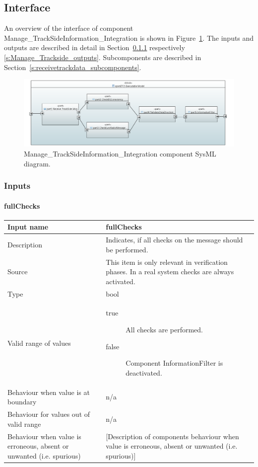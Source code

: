 \subsection{Interface}

An overview of the interface of component Manage\_TrackSideInformation\_Integration is shown in Figure~\ref{f:receiveAndCheckConsistencyArch}. The inputs and outputs are described in detail in Section~\ref{s:Manage_Trackside_inputs} respectively \ref{s:Manage_Trackside_outputs}. Subcomponents are described in Section~\ref{s:receivetrackdata_subcomponents}.

\begin{figure}
\center
\includegraphics[width=\textwidth]{./images/Input-Messages4.PNG}
\caption{Manage\_TrackSideInformation\_Integration component SysML diagram.}\label{f:receiveAndCheckConsistencyArch}
\end{figure}


\subsubsection{Inputs}\label{s:Manage_Trackside_inputs}

\paragraph{fullChecks}

\begin{longtable}{p{}p{}}
\toprule
Input name				& fullChecks \\
\midrule
Description				& Indicates, if all checks on the message should be performed. \\
\midrule
Source					& This item is only relevant in verification phases. In a real system checks are always activated. \\ 
\midrule
Type					& bool \\
\midrule
Valid range of values	& 
\begin{description}
\item[true] All checks are performed.
\item[false] Component InformationFilter is deactivated.
\end{description} \\
\midrule
Behaviour when value is at boundary	& n/a \\
\midrule
Behaviour for values out of valid range	& n/a \\
\midrule
Behaviour when value is erroneous, absent or unwanted (i.e. spurious) & [Description of components behaviour when value is erroneous, absent or unwanted (i.e. spurious)] \\
\bottomrule
\end{longtable}


